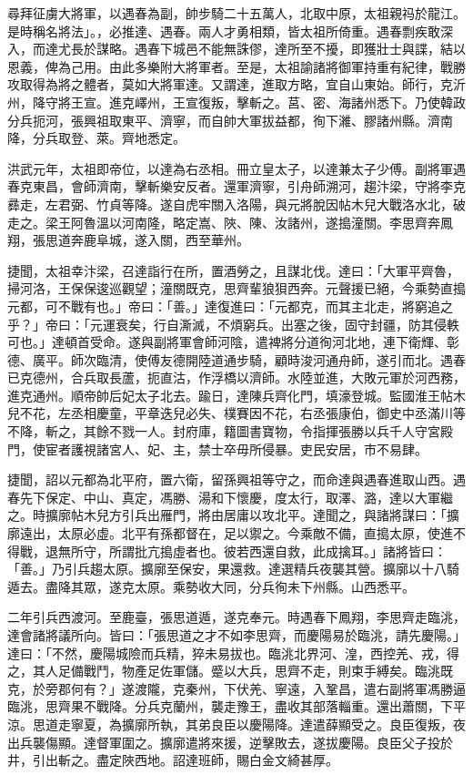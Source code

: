 \begin{pinyinscope}
尋拜征虜大將軍，以遇春為副，帥步騎二十五萬人，北取中原，太祖親祃於龍江。是時稱名將法」。，必推達、遇春。兩人才勇相類，皆太祖所倚重。遇春剽疾敢深入，而達尤長於謀略。遇春下城邑不能無誅僇，達所至不擾，即獲壯士與諜，結以恩義，俾為己用。由此多樂附大將軍者。至是，太祖諭諸將御軍持重有紀律，戰勝攻取得為將之體者，莫如大將軍達。又謂達，進取方略，宜自山東始。師行，克沂州，降守將王宣。進克嶧州，王宣復叛，擊斬之。莒、密、海諸州悉下。乃使韓政分兵扼河，張興祖取東平、濟寧，而自帥大軍拔益都，徇下濰、膠諸州縣。濟南降，分兵取登、萊。齊地悉定。

洪武元年，太祖即帝位，以達為右丞相。冊立皇太子，以達兼太子少傅。副將軍遇春克東昌，會師濟南，擊斬樂安反者。還軍濟寧，引舟師溯河，趨汴梁，守將李克彞走，左君弼、竹貞等降。遂自虎牢關入洛陽，與元將脫因帖木兒大戰洛水北，破走之。梁王阿魯溫以河南隆，略定嵩、陜、陳、汝諸州，遂搗潼關。李思齊奔鳳翔，張思道奔鹿阜城，遂入關，西至華州。

捷聞，太祖幸汴梁，召達詣行在所，置酒勞之，且謀北伐。達曰：「大軍平齊魯，掃河洛，王保保逡巡觀望；潼關既克，思齊輩狼狽西奔。元聲援已絕，今乘勢直搗元都，可不戰有也。」帝曰：「善。」達復進曰：「元都克，而其主北走，將窮追之乎？」帝曰：「元運衰矣，行自澌滅，不煩窮兵。出塞之後，固守封疆，防其侵軼可也。」達頓首受命。遂與副將軍會師河陰，遣裨將分道徇河北地，連下衛輝、彰德、廣平。師次臨清，使傅友德開陸道通步騎，顧時浚河通舟師，遂引而北。遇春已克德州，合兵取長蘆，扼直沽，作浮橋以濟師。水陸並進，大敗元軍於河西務，進克通州。順帝帥后妃太子北去。踰日，達陳兵齊化門，填濠登城。監國淮王帖木兒不花，左丞相慶童，平章迭兒必失、樸賽因不花，右丞張康伯，御史中丞滿川等不降，斬之，其餘不戮一人。封府庫，籍圖書寶物，令指揮張勝以兵千人守宮殿門，使宦者護視諸宮人、妃、主，禁士卒毋所侵暴。吏民安居，市不易肆。

捷聞，詔以元都為北平府，置六衛，留孫興祖等守之，而命達與遇春進取山西。遇春先下保定、中山、真定，馮勝、湯和下懷慶，度太行，取澤、潞，達以大軍繼之。時擴廓帖木兒方引兵出雁門，將由居庸以攻北平。達聞之，與諸將謀曰：「擴廓遠出，太原必虛。北平有孫都督在，足以禦之。今乘敵不備，直搗太原，使進不得戰，退無所守，所謂批亢搗虛者也。彼若西還自救，此成擒耳。」諸將皆曰：「善。」乃引兵趨太原。擴廓至保安，果還救。達選精兵夜襲其營。擴廓以十八騎遁去。盡降其眾，遂克太原。乘勢收大同，分兵徇未下州縣。山西悉平。

二年引兵西渡河。至鹿臺，張思道遁，遂克奉元。時遇春下鳳翔，李思齊走臨洮，達會諸將議所向。皆曰：「張思道之才不如李思齊，而慶陽易於臨洮，請先慶陽。」達曰：「不然，慶陽城險而兵精，猝未易拔也。臨洮北界河、湟，西控羌、戎，得之，其人足備戰鬥，物產足佐軍儲。蹙以大兵，思齊不走，則束手縛矣。臨洮既克，於旁郡何有？」遂渡隴，克秦州，下伏羌、寧遠，入鞏昌，遣右副將軍馮勝逼臨洮，思齊果不戰降。分兵克蘭州，襲走豫王，盡收其部落輜重。還出蕭關，下平涼。思道走寧夏，為擴廓所執，其弟良臣以慶陽降。達遣薛顯受之。良臣復叛，夜出兵襲傷顯。達督軍圍之。擴廓遣將來援，逆擊敗去，遂拔慶陽。良臣父子投於井，引出斬之。盡定陜西地。詔達班師，賜白金文綺甚厚。


\end{pinyinscope}
